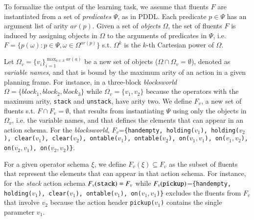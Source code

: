 \documentclass[3p,times]{elsarticle}
\begin{document}
To formalize the output of the learning task, we assume that fluents $F$ are instantiated from a set of {\em predicates} $\Psi$, as in PDDL. Each predicate $p\in\Psi$ has an argument list of arity $ar(p)$. Given a set of {\em objects} $\Omega$, the set of fluents $F$ is induced by assigning objects in $\Omega$ to the arguments of predicates in $\Psi$, i.e.~$F=\{p(\omega):p\in\Psi,\omega\in\Omega^{ar(p)}\}$ s.t. $\Omega^k$ is the $k$-th Cartesian power of $\Omega$.

Let $\Omega_v=\{v_i\}_{i=1}^{\operatorname*{max}_{a\in A} ar(a)}$ be a new set of objects ($\Omega\cap\Omega_v=\emptyset$), denoted as {\em variable names}, and that is bound by the maximum arity of an action in a given planning frame. For instance, in a three-block {\em blocksworld} $\Omega=\{block_1, block_2, block_3\}$ while $\Omega_v=\{v_1, v_2\}$ because the operators with the maximum arity, {\small\tt stack} and {\small\tt unstack}, have arity two. We define $F_v$, a new set of fluents s.t. $F\cap F_v=\emptyset$, that results from instantiating $\Psi$ using only the objects in $\Omega_v$, i.e. the variable names, and that defines the elements that can appear in an action schema. For the {\em blocksworld}, $F_v$={\small\tt\{handempty, holding($v_1$), holding($v_2$), clear($v_1$), clear($v_2$), ontable($v_1$), ontable($v_2$), on($v_1,v_1$), on($v_1,v_2$), on($v_2,v_1$), on($v_2,v_2$)\}}.

For a given operator schema $\xi$, we define $F_v(\xi)\subseteq F_v$ as the subset of fluents that represent the elements that can appear in that action schema. For instance, for the {\em stack} action schema $F_v({\tt stack})=F_v$ while $F_v({\tt pickup})$={\small\tt\{handempty, holding($v_1$), clear($v_1$), ontable($v_1$), on($v_1,v_1$)\}} excludes the fluents from $F_v$ that involve $v_2$ because the action header {\small\tt pickup($v_1$)} contains the single parameter $v_1$.
\end{document}
